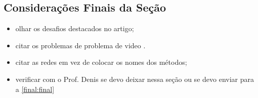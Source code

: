 \subsection{Considerações Finais da Seção}
\begin{itemize}
    \item olhar os desafios destacados no artigo;
    \item citar os problemas de problema de video \cite{Kim2020}.
\end{itemize}

\begin{itemize}
    \item citar as redes em vez de colocar os nomes dos métodos;
    \item verificar com o Prof. Denis se devo deixar nessa seção ou se devo enviar para a \ref{final:final}
\end{itemize}

